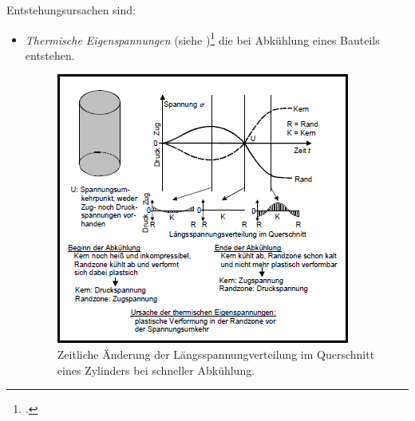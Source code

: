\documentclass[12pt,a4paper,parskip]{scrartcl}
\begin{document}
Entstehungsursachen sind:
\begin{itemize}
\item \emph{Thermische Eigenspannungen} (siehe )\footcite[34]{hu} die bei Abkühlung eines Bauteils entstehen.\begin{figure}[!htb]
  \centering
  \includegraphics[scale=1.5] {eigenspanabk}
  \caption{Zeitliche Änderung der Längsspannungverteilung im Querschnitt eines Zylinders bei schneller Abkühlung.}
  \label{fig:eigenspanabk}
  \end{figure}


\end{itemize}
\end{document}
